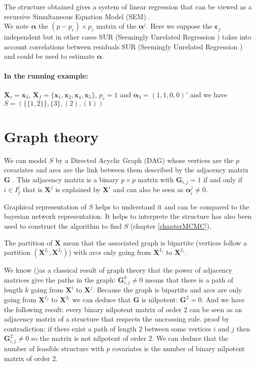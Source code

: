 \documentclass[12pt,a4paper]{report}
\begin{document}
The structure obtained gives a system of linear regression that can be viewed as a recursive Simultaneous Equation Model (\textsc{SEM})\cite{davidson1993estimation} \cite{TIMM}.
\\
We note $\boldsymbol{\alpha}$ the $(p-p_r)\times p_r$ matrix of the  $\boldsymbol{\alpha}^j$.
  	Here we suppose the $\boldsymbol{\varepsilon}_j$ independent but in other cases \textsc{SUR} (Seemingly Unrelated Regression \cite{SURzellner}) takes into account correlations between residuals \textsc{SUR} (Seemingly Unrelated Regression \cite{SURzellner}) and could be used to estimate $\boldsymbol{\alpha}$. 
		 
	 
\paragraph{In the running example:}$\boldsymbol{X}_r=\boldsymbol{x}_3$, $\boldsymbol{X}_f=\{\boldsymbol{x}_1,\boldsymbol{x}_2,\boldsymbol{x}_4,\boldsymbol{x}_5 \}$, $p_r=1$ and $\boldsymbol{\alpha}_3=(1,1,0,0)'$ and we have $S= \left( \{ \{1,2\}\},\{3\},(2),(1)\right)$


\section{Graph theory}\label{sectiongraph}
	We can model $S$ by a Directed Acyclic Graph (DAG) whose vertices are the $p$ covariates and arcs are the link between them described by the adjacency matrix $\boldsymbol{G}$ \cite{bondy1976graph}. This adjacency matrix is a binary $p\times p$ matrix with $\boldsymbol{G}_{i,j}=1$ if and only if $i \in I_f^j$ that is $\boldsymbol{X}^j$ is explained by $\boldsymbol{X}^i$ and can also be seen as $\boldsymbol{\alpha}_i^j\neq 0$.
	
	Graphical representation of $S$ helps to understand it and can be compared to the bayesian network representation. It helps to interprete the structure has also been used to construct the algorithm to find $S$ (chapter \ref{chapterMCMC}).


	
	The partition of $\boldsymbol{X}$ mean that the associated graph is bipartite (vertices follow a partition $(\boldsymbol{X}^{I_r},\boldsymbol{X}^{I_f})$) with arcs only going from $\boldsymbol{X}^{I_f}$ to $\boldsymbol{X}^{I_r}$.
	
	We know (\cite{biggs1993algebraic})as a classical result of graph theory that the power of adjacency matrices give the paths in the graph: $\boldsymbol{G}^k_{i,j}\neq 0$ means that there is a path of length $k$ going from $\boldsymbol{X}^i$ to $\boldsymbol{X}^j$. Because the graph is bipartite and arcs are only going from $\boldsymbol{X}^{I_f}$ to $\boldsymbol{X}^{I_r}$ we can deduce that $\boldsymbol{G}$ is nilpotent: $\boldsymbol{G}^2=0$. And we have the following result: every binary nilpotent matrix of order 2 can be seen as an adjacency matrix of a structure that respects the uncrossing rule. proof by contradiction: if there exist a path of length 2 between some vertices $i$ and $j$ then $\boldsymbol{G}^2_{i,j}\neq 0$ so the matrix is not nilpotent of order 2. We can deduce that the number of feasible structure with $p$ covariates is the number of binary nilpotent matrix of order 2.
	
\end{document}
